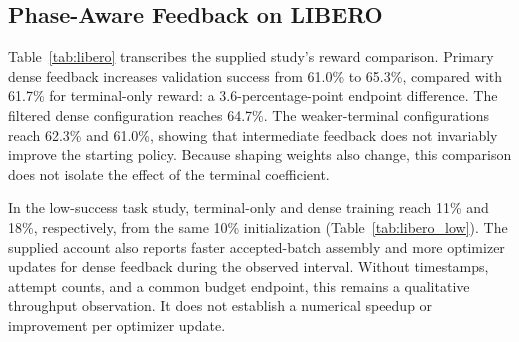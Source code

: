\subsection{Phase-Aware Feedback on LIBERO}\label{sec:libero_results}
Table~\ref{tab:libero} transcribes the supplied study's reward comparison. Primary dense feedback increases validation success from 61.0\% to 65.3\%, compared with 61.7\% for terminal-only reward: a 3.6-percentage-point endpoint difference. The filtered dense configuration reaches 64.7\%. The weaker-terminal configurations reach 62.3\% and 61.0\%, showing that intermediate feedback does not invariably improve the starting policy. Because shaping weights also change, this comparison does not isolate the effect of the terminal coefficient.


In the low-success task study, terminal-only and dense training reach 11\% and 18\%, respectively, from the same 10\% initialization (Table~\ref{tab:libero_low}). The supplied account also reports faster accepted-batch assembly and more optimizer updates for dense feedback during the observed interval. Without timestamps, attempt counts, and a common budget endpoint, this remains a qualitative throughput observation. It does not establish a numerical speedup or improvement per optimizer update.

